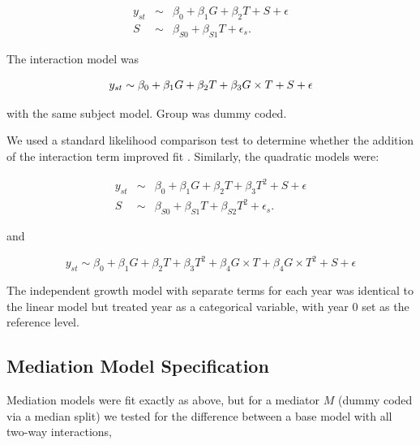 \documentclass[11pt]{article}
\begin{document}
\begin{eqnarray}
y_{st} &\sim& \beta_{0} + \beta_{1} G + \beta_{2} T + S + \epsilon\\
S &\sim& \beta_{S0} + \beta_{S1} T + \epsilon_{s}.
\end{eqnarray}

\noindent The interaction model was

\begin{equation}
y_{st} \sim \beta_{0} + \beta_{1} G + \beta_{2} T + \beta_3 G \times T +  S + \epsilon\\
\end{equation}

\noindent with the same subject model. Group was dummy coded.

We used a standard likelihood comparison test to determine whether the addition of the interaction term improved fit \cite{pinheiro2000,barr2013}. Similarly, the quadratic models were:

\begin{eqnarray}
  y_{st} &\sim& \beta_{0} + \beta_{1} G + \beta_{2} T + \beta_{3} T^2 + S + \epsilon\\
S &\sim& \beta_{S0} + \beta_{S1} T + \beta_{S2} T^2 + \epsilon_{s}.
\end{eqnarray}

\noindent and

\begin{equation}
  y_{st} \sim \beta_{0} + \beta_{1} G + \beta_{2} T + \beta_{3} T^2 + \beta_4 G \times T + \beta_4 G \times T^2 + S + \epsilon
\end{equation}

\noindent The independent growth model with separate terms for each year was identical to the linear model but treated year as a categorical variable, with year 0 set as the reference level.

\subsection{Mediation Model Specification}


Mediation models were fit exactly as above, but for a mediator $M$ (dummy coded via a median split) we tested for the difference between a base model with all two-way interactions,
\end{document}

